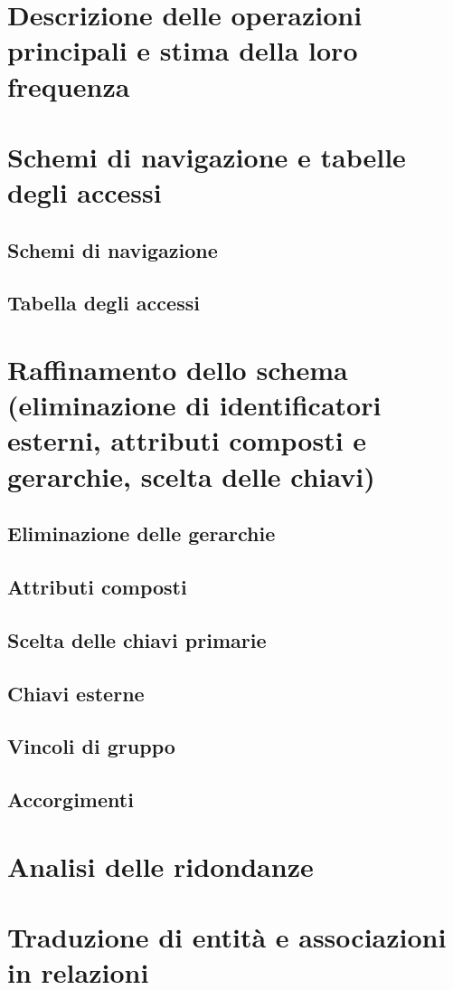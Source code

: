 \documentclass[a4paper,12pt]{report}
\begin{document}
	\section{Descrizione delle operazioni principali e stima della loro frequenza}
	\section{Schemi di navigazione e tabelle degli accessi}
	\subsection{Schemi di navigazione}
	\subsection{Tabella degli accessi}
	\section{Raffinamento dello schema (eliminazione di identificatori esterni, attributi composti e gerarchie, scelta delle chiavi)}
	\subsection{Eliminazione delle gerarchie}
	\subsection{Attributi composti}
	\subsection{Scelta delle chiavi primarie}
	\subsection{Chiavi esterne}
	\subsection{Vincoli di gruppo}
	\subsection{Accorgimenti}
	\section{Analisi delle ridondanze}
	\section{Traduzione di entità e associazioni in relazioni}
\end{document}
